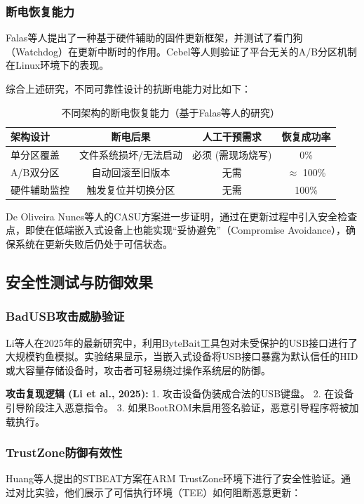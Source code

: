 \documentclass[a4paper,12pt]{article}
\begin{document}
\subsubsection{断电恢复能力}
Falas等人提出了一种基于硬件辅助的固件更新框架，并测试了看门狗（Watchdog）在更新中断时的作用\cite{Falas2019}。Cebel等人则验证了平台无关的A/B分区机制在Linux环境下的表现\cite{Cebel2022}。

综合上述研究，不同可靠性设计的抗断电能力对比如下：

\begin{table}[H]
\centering
\caption{不同架构的断电恢复能力（基于Falas等人的研究\cite{Falas2019}）}
\begin{tabular}{lccc}
\toprule
\textbf{架构设计} & \textbf{断电后果} & \textbf{人工干预需求} & \textbf{恢复成功率} \\
\midrule
单分区覆盖 & 文件系统损坏/无法启动 & 必须 (需现场烧写) & 0\% \\
A/B双分区 & 自动回滚至旧版本 & 无需 & $\approx$ 100\% \\
硬件辅助监控 & 触发复位并切换分区 & 无需 & 100\% \\
\bottomrule
\end{tabular}
\end{table}

De Oliveira Nunes等人的CASU方案进一步证明，通过在更新过程中引入安全检查点，即使在低端嵌入式设备上也能实现“妥协避免”（Compromise Avoidance），确保系统在更新失败后仍处于可信状态\cite{DeOliveiraNunes2022}。

\subsection{安全性测试与防御效果}

\subsubsection{BadUSB攻击威胁验证}
Li等人在2025年的最新研究中，利用ByteBait工具包对未受保护的USB接口进行了大规模钓鱼模拟\cite{Li2025}。实验结果显示，当嵌入式设备将USB接口暴露为默认信任的HID或大容量存储设备时，攻击者可轻易绕过操作系统层的防御。

\textbf{攻击复现逻辑 (Li et al., 2025):}
1. 攻击设备伪装成合法的USB键盘。
2. 在设备引导阶段注入恶意指令。
3. 如果BootROM未启用签名验证，恶意引导程序将被加载执行。

\subsubsection{TrustZone防御有效性}
Huang等人提出的STBEAT方案在ARM TrustZone环境下进行了安全性验证\cite{Huang2022}。通过对比实验，他们展示了可信执行环境（TEE）如何阻断恶意更新：
\end{document}

